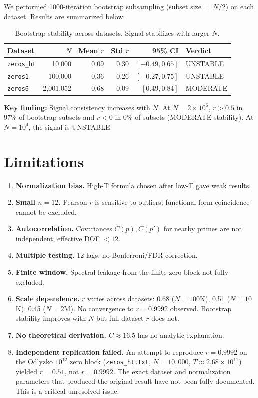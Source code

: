 \documentclass[11pt]{article}
\begin{document}
We performed 1000-iteration bootstrap subsampling (subset size $= N/2$)
on each dataset. Results are summarized below:

\begin{table}[h]
\centering
\begin{tabular}{lrrrrl}
\toprule
Dataset & $N$ & Mean $r$ & Std $r$ & 95\% CI & Verdict \\
\midrule
\texttt{zeros\_ht} & 10,000  & 0.09 & 0.30 & $[-0.49, 0.65]$ & UNSTABLE \\
\texttt{zeros1}   & 100,000 & 0.36 & 0.26 & $[-0.27, 0.75]$ & UNSTABLE \\
\texttt{zeros6}   & 2,001,052 & 0.68 & 0.09 & $[0.49, 0.84]$ & MODERATE \\
\bottomrule
\end{tabular}
\caption{Bootstrap stability across datasets. Signal stabilizes with larger $N$.}
\end{table}

\textbf{Key finding:} Signal consistency increases with $N$.
At $N = 2 \times 10^6$, $r > 0.5$ in 97\% of bootstrap subsets
and $r < 0$ in 0\% of subsets (MODERATE stability).
At $N = 10^4$, the signal is UNSTABLE.

\section{Limitations}

\begin{enumerate}[label=\arabic*.]
\item \textbf{Normalization bias.} High-T formula chosen after low-T gave weak results.
\item \textbf{Small $n=12$.} Pearson $r$ is sensitive to outliers; functional form coincidence cannot be excluded.
\item \textbf{Autocorrelation.} Covariances $C(p), C(p')$ for nearby primes are not independent; effective DOF $<12$.
\item \textbf{Multiple testing.} 12 lags, no Bonferroni/FDR correction.
\item \textbf{Finite window.} Spectral leakage from the finite zero block not fully excluded.
\item \textbf{Scale dependence.} $r$ varies across datasets: 0.68 ($N=100$K), 0.51 ($N=10$K), 0.45 ($N=2$M). No convergence to $r=0.9992$ observed. Bootstrap stability improves with $N$ but full-dataset $r$ does not.
\item \textbf{No theoretical derivation.} $C \approx 16.5$ has no analytic explanation.
\item \textbf{Independent replication failed.} An attempt to reproduce $r = 0.9992$ on the Odlyzko $10^{12}$ zero block (\texttt{zeros\_ht.txt}, $N=10{,}000$, $T \approx 2.68 \times 10^{11}$) yielded $r = 0.51$, not $r = 0.9992$. The exact dataset and normalization parameters that produced the original result have not been fully documented. This is a critical unresolved issue.
\end{enumerate}
\end{document}
